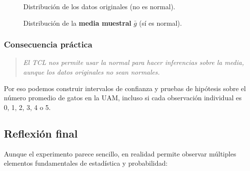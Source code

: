 \begin{figure}[H]
\centering
{}
\caption{Distribución de los datos originales (no es normal).}
\end{figure}

\begin{figure}[H]
\centering
{}
\caption{Distribución de la \textbf{media muestral} \(\bar{g}\) (sí es normal).}
\end{figure}

\subsubsection{Consecuencia práctica}

\begin{quote}
\centering
\textit{El TCL nos permite usar la normal para hacer inferencias sobre la media,} \\
\textit{aunque los datos originales no sean normales.}
\end{quote}

Por eso podemos construir intervalos de confianza y pruebas de hipótesis sobre el número promedio de gatos en la UAM, incluso si cada observación individual es 0, 1, 2, 3, 4 o 5.

\subsection{Reflexión final}

Aunque el experimento parece sencillo, en realidad permite observar múltiples elementos fundamentales de estadística y probabilidad:

